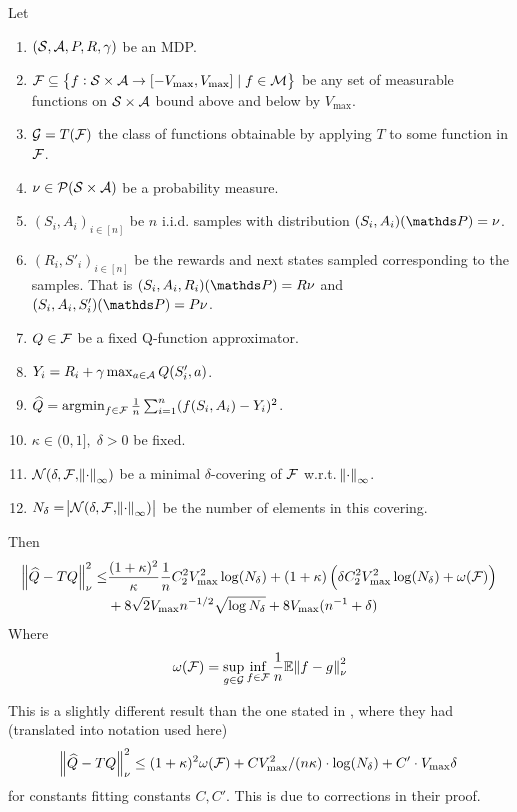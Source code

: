 
\begin{thm}\label{thm:oneStep}
  Let
  \begin{enumerate}
    \item $(\mathcal{S}, \mathcal{A}, P, R, \gamma)$ be an MDP.
    \item $\mathcal{F} \subseteq 
      \left\{ f : \mathcal{S} \times \mathcal{A} \to [-V_{\max}, V_{\max}]
      \mid f \in \mathcal{M} \right\}$
      be any set of measurable functions on $\mathcal{S} \times \mathcal{A}$
      bound above and below by $V_{\max}$.
    \item $\mathcal{G} = T(\mathcal{F})$ the class of functions obtainable by
      applying $T$ to some function in $\mathcal{F}$.
    \item $\nu \in \mathcal{P}(\mathcal{S} \times \mathcal{A})$ be a probability measure.
    \item $(S_i, A_i)_{i\in[n]}$ be $n$ i.i.d. samples with distribution
      $(S_i, A_i)(\Prob) = \nu$.
    \item $(R_i, S'_i)_{i\in[n]}$ be the rewards and next states sampled
      corresponding to the samples.
      That is $(S_i, A_i, R_i)(\Prob) = R \nu$
      and $(S_i, A_i, S'_i)(\Prob) = P \nu$. 
    \item $Q \in \mathcal{F}$ be a fixed Q-function approximator.
    \item $Y_i = R_i + \gamma \max_{a \in \mathcal{A}} Q(S'_i, a)$.
    \item $\widehat{Q} = \operatorname*{argmin}_{f \in \mathcal{F}} \frac{1}{n}
      \sum_{i=1}^n (f(S_i, A_i) - Y_i)^2$.
    \item $\kappa \in (0,1],\; \delta > 0$ be fixed.
    \item $\mathcal{N}(\delta, \mathcal{F}, \norm{\cdot}_\infty)$
      be a minimal $\delta$-covering of $\mathcal{F}$ w.r.t. $\norm{\cdot}_\infty$.
    \item $N_\delta = \abs{\mathcal{N}(\delta, \mathcal{F}, \norm{\cdot}_\infty)}$
      be the number of elements in this covering.
  \end{enumerate}
  Then
  \begin{align*}
    \norm{\widehat{Q} - TQ}_\nu^2
    \leq & \frac{(1+\kappa)^2}{\kappa} \frac{1}{n} C_2^2 V_{\max}^2 \log(N_\delta)
    + (1 + \kappa) \left( \delta C_2^2 V_{\max}^2 \log(N_\delta)
    + \omega(\mathcal{F}) \right) 
    \notag
    \\ & + 8 \sqrt{2} V_{\max} n^{-1/2} \sqrt{\log N_\delta}
    + 8 V_{\max} (n^{-1} + \delta)
  \end{align*}
  Where
  \begin{equation*}
    \omega(\mathcal{F}) = \sup_{g \in \mathcal{G}} \inf_{f \in \mathcal{F}}
    \frac{1}{n} \mathbb{E} \norm{f - g}_\nu^2
    \label{eq:defomega}
  \end{equation*}
\end{thm}

This is a slightly different result than the one stated in ,
where they had (translated into notation used here)
\begin{equation}
  \norm{\widehat{Q} - TQ}_\nu^2
  \leq (1+\kappa)^2 \omega(\mathcal{F}) + C V_{\max}^2/(n \kappa)
  \cdot \log (N_\delta) + C'\cdot V_{\max} \delta
  \label{eq:onestepFan}
\end{equation}
for constants fitting constants $C, C'$.
This is due to corrections in their proof.

